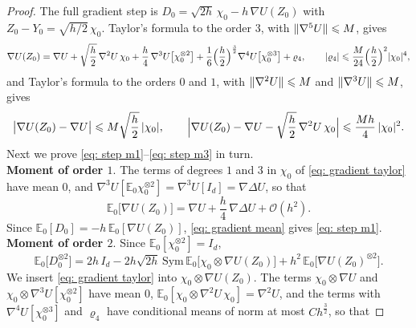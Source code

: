 \begin{proof}
    The full gradient step is $D_0 = \sqrt{2h}\, \chi_0 - h\, \nabla U(Z_0)$ with $Z_0 - Y_0 = \sqrt{h/2}\, \chi_0$. Taylor's formula to the order $3$, with $\lVert \nabla^5 U \rVert \leqslant M$, gives
    \begin{equation}
        \nabla U(Z_0) = \nabla U + \sqrt{\frac h2}\, \nabla^2 U\, \chi_0 + \frac h4\, \nabla^3 U\bigl[ \chi_0^{\otimes 2} \bigr] + \frac16 \Bigl( \frac h2 \Bigr)^{\frac32} \nabla^4 U\bigl[ \chi_0^{\otimes 3} \bigr] + \varrho_4 , \qquad |\varrho_4| \leqslant \frac{M}{24} \Bigl( \frac h2 \Bigr)^2 |\chi_0|^4 ,
        \label{eq: gradient taylor}
    \end{equation}
    and Taylor's formula to the orders $0$ and $1$, with $\lVert \nabla^2 U \rVert \leqslant M$ and $\lVert \nabla^3 U \rVert \leqslant M$, gives
    \begin{equation}
        \bigl| \nabla U(Z_0) - \nabla U \bigr| \leqslant M \sqrt{\frac h2}\, |\chi_0| , \qquad
        \Bigl| \nabla U(Z_0) - \nabla U - \sqrt{\frac h2}\, \nabla^2 U\, \chi_0 \Bigr| \leqslant \frac{M h}{4}\, |\chi_0|^2 .
        \label{eq: gradient taylor crude}
    \end{equation}
    Next we prove \eqref{eq: step m1}--\eqref{eq: step m3} in turn.\\[6pt]
    \textbf{Moment of order $1$}. The terms of degrees $1$ and $3$ in $\chi_0$ of \eqref{eq: gradient taylor} have mean $0$, and $\nabla^3 U[\mathbb E_0 \chi_0^{\otimes 2}] = \nabla^3 U[I_d] = \nabla \Delta U$, so that
    \begin{equation}
        \mathbb E_0\bigl[ \nabla U(Z_0) \bigr] = \nabla U + \frac h4\, \nabla \Delta U + \mathcal O(h^2) .
        \label{eq: gradient mean}
    \end{equation}
    Since $\mathbb E_0[D_0] = -h\, \mathbb E_0[\nabla U(Z_0)]$, \eqref{eq: gradient mean} gives \eqref{eq: step m1}.\\[6pt]
    \textbf{Moment of order $2$}. Since $\mathbb E_0[\chi_0^{\otimes 2}] = I_d$,
    \begin{equation}
        \mathbb E_0\bigl[ D_0^{\otimes 2} \bigr] = 2h\, I_d - 2h\sqrt{2h}\, \mathrm{Sym}\, \mathbb E_0\bigl[ \chi_0 \otimes \nabla U(Z_0) \bigr] + h^2\, \mathbb E_0\bigl[ \nabla U(Z_0)^{\otimes 2} \bigr] .
        \label{eq: step square}
    \end{equation}
    We insert \eqref{eq: gradient taylor} into $\chi_0 \otimes \nabla U(Z_0)$. The terms $\chi_0 \otimes \nabla U$ and $\chi_0 \otimes \nabla^3 U[\chi_0^{\otimes 2}]$ have mean $0$, $\mathbb E_0[\chi_0 \otimes \nabla^2 U\, \chi_0] = \nabla^2 U$, and the terms with $\nabla^4 U[\chi_0^{\otimes 3}]$ and $\varrho_4$ have conditional means of norm at most $C h^{\frac32}$, so that

\end{proof}
